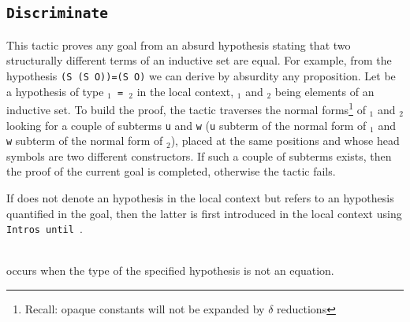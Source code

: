\subsection {\tt Discriminate {\ident}}
\label{Discriminate}
This tactic proves any goal from an absurd
hypothesis stating that two structurally different terms of an
inductive set are equal. For example, from the hypothesis {\tt (S (S
  O))=(S O)} we can derive by absurdity any proposition.  Let {\ident}
be a hypothesis of type {\tt{\term$_1$} = {\term$_2$}} in the local
context, {\term$_1$} and {\term$_2$} being elements of an inductive set.
To build the proof, the tactic traverses the normal
forms\footnote{Recall: opaque constants will not be expanded by
  $\delta$ reductions} of {\term$_1$} and {\term$_2$} looking for a
couple of subterms {\tt u} and {\tt w} ({\tt u} subterm of the normal
form of {\term$_1$} and {\tt w} subterm of the normal form of
{\term$_2$}), placed at the same positions and whose
head symbols are two different constructors. If such a couple of subterms
exists, then the proof of the current goal is completed,
otherwise the tactic fails.

\Rem If {\ident} does not denote an hypothesis in the local context
but refers to an hypothesis quantified in the goal, then the
latter is first introduced in the local context using
\texttt{Intros until \ident}.

\begin{ErrMsgs}
\item {\ident}  \\
  occurs when the type of the specified hypothesis is not an equation.
\end{ErrMsgs}  


